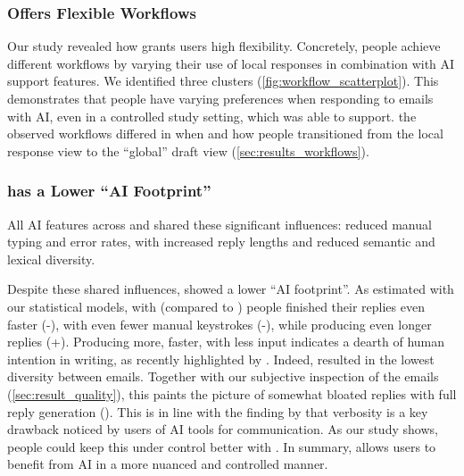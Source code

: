\subsubsection{\modeours{} Offers Flexible Workflows}
Our study revealed how \modeours{} grants users high flexibility. Concretely, people achieve different workflows by varying their use of local responses in combination with AI support features. We identified three clusters (\cref{fig:workflow_scatterplot}). This demonstrates that people have varying preferences when responding to emails with AI, even in a controlled study setting, which \modeours{} was able to support.
 the observed workflows differed in when and how people transitioned from the local response view to the ``global'' draft view (\cref{sec:results_workflows}). %


\subsubsection{\modeours{} has a Lower ``AI Footprint''}
All AI features across \modeours{} and \modemail{} shared these significant influences: reduced manual typing and error rates, with increased reply lengths and reduced semantic and lexical diversity. 

Despite these shared influences, \modeours{} showed a lower ``AI footprint''.
As estimated with our statistical models, with \modemail{} (compared to \modeours) people finished their replies even faster (-), with even fewer manual keystrokes (-), while producing even longer replies (+). Producing more, faster, with less input indicates a dearth of human intention in writing, as recently highlighted by \citet{kreminski2024dearthauthor}. Indeed, \modemail{} resulted in the lowest diversity between emails.
Together with our subjective inspection of the emails (\cref{sec:result_quality}), this paints the picture of somewhat bloated replies with full reply generation (\modemail). This is in line with the finding by \citet{fu2024texttoself} that verbosity is a key drawback noticed by users of AI tools for communication. As our study shows, people could keep this under control better with \modeours{}. In summary, \modeours{} allows users to benefit from AI in a more nuanced and controlled manner.










